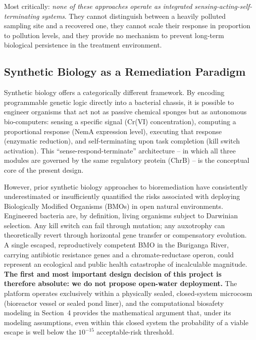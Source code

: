 \documentclass[10pt,twocolumn,letterpaper,
              colorlinks=true,
              linkcolor=blue!70!black,
              citecolor=blue!70!black,
              urlcolor=blue!70!black,
              pdfborder={0 0 0}]{article}
\begin{document}
Most critically: \textit{none of these approaches operate as integrated
sensing-acting-self-terminating systems}. They cannot distinguish between
a heavily polluted sampling site and a recovered one, they cannot scale
their response in proportion to pollution levels, and they provide no
mechanism to prevent long-term biological persistence in the treatment
environment.

\subsection{Synthetic Biology as a Remediation Paradigm}

Synthetic biology offers a categorically different framework. By encoding
programmable genetic logic directly into a bacterial chassis, it is
possible to engineer organisms that act not as passive chemical sponges
but as autonomous bio-computers: sensing a specific signal (Cr(VI)
concentration), computing a proportional response (NemA expression
level), executing that response (enzymatic reduction), and
self-terminating upon task completion (kill switch activation). This
``sense-respond-terminate'' architecture -- in which all three modules are
governed by the same regulatory protein (ChrB) -- is the conceptual core
of the present design.

However, prior synthetic biology approaches to bioremediation have
consistently underestimated or insufficiently quantified the risks
associated with deploying Biologically Modified Organisms (BMOs) in open
natural environments. Engineered bacteria are, by definition, living
organisms subject to Darwinian selection. Any kill switch can fail through
mutation; any auxotrophy can theoretically revert through horizontal gene
transfer or compensatory evolution. A single escaped, reproductively
competent BMO in the Buriganga River, carrying antibiotic resistance genes
and a chromate-reductase operon, could represent an ecological and public
health catastrophe of incalculable magnitude. \textbf{The first and most
important design decision of this project is therefore absolute: we do not
propose open-water deployment.} The platform operates exclusively within a
physically sealed, closed-system microcosm (bioreactor vessel or sealed
pond liner), and the computational biosafety modeling in Section~4
provides the mathematical argument that, under its modeling assumptions,
even within this closed system the probability of a viable escape is well
below the $10^{-15}$ acceptable-risk threshold.
\end{document}
